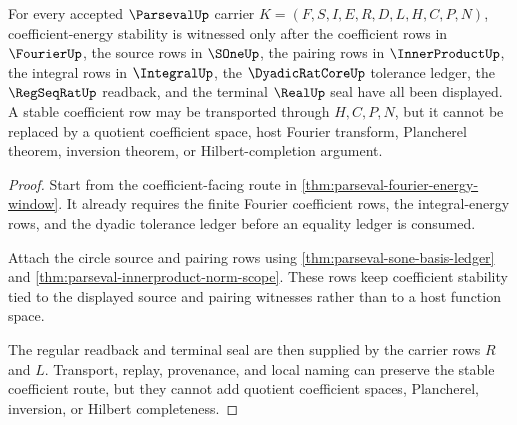 \begin{theorem}
\label{thm:parseval-root-coefficient-stability}
For every accepted $\ParsevalUp$ carrier $K=(F,S,I,E,R,D,L,H,C,P,N)$, coefficient-energy stability is witnessed only after the coefficient rows in $\FourierUp$, the source rows in $\SOneUp$, the pairing rows in $\InnerProductUp$, the integral rows in $\IntegralUp$, the $\DyadicRatCoreUp$ tolerance ledger, the $\RegSeqRatUp$ readback, and the terminal $\RealUp$ seal have all been displayed. A stable coefficient row may be transported through $H,C,P,N$, but it cannot be replaced by a quotient coefficient space, host Fourier transform, Plancherel theorem, inversion theorem, or Hilbert-completion argument.
\end{theorem}
\begin{proof}
Start from the coefficient-facing route in \autoref{thm:parseval-fourier-energy-window}. It already requires the finite Fourier coefficient rows, the integral-energy rows, and the dyadic tolerance ledger before an equality ledger is consumed.

Attach the circle source and pairing rows using \autoref{thm:parseval-sone-basis-ledger} and \autoref{thm:parseval-innerproduct-norm-scope}. These rows keep coefficient stability tied to the displayed source and pairing witnesses rather than to a host function space.

The regular readback and terminal seal are then supplied by the carrier rows $R$ and $L$. Transport, replay, provenance, and local naming can preserve the stable coefficient route, but they cannot add quotient coefficient spaces, Plancherel, inversion, or Hilbert completeness.
\end{proof}

